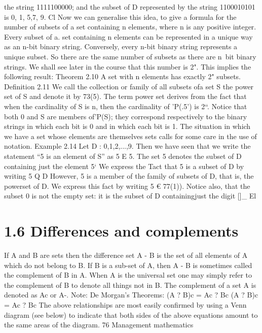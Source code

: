 \documentclass{beamer}
\begin{document}
\begin{frame}
\begin{frame}
the string 1111100000; and the subset of D represented by the string 1100010101 is {0, 1, 5,7, 9}.
Cl
Now we can generalise this idea, to give a formula for the number of subsets of a set containing
n elements, where n is any positive integer. Every subset of a. set containing n elements can
be represented in a unique way as an n-bit binary string. Conversely, every n-bit binary string
represents a unique subset. So there are the same number of subsets as there are n~bit binary
strings. We shall see later in the course that this number is 2". This implies the following result:
Theorem 2.10 A set with n elements has exactly 2" subsets.
Deﬁnition 2.11 We call the collection or family of all subsets ofa set S the power set of S and
denote it by 73(5).
The term power set derives from the fact that when the cardinality of S is n, then the cardinality
of ’P(.5') is 2“. Notice that both 0 and S are members of'P(S); they correspond respectively to the
binary strings in which each bit is 0 and in which each bit is 1.
The situation in which we have a set whose elements are themselves sets calls for some care in the
use of notation.
Example 2.14 Let D : {0,1,2,...,9}. Then we have seen that we write the statement “5 is an
element of S” as
5 E 5.
The set {5} denotes the subset of D containing just the element 5‘ We express the Tact that {5}
is a subset of D by writing
{5} Q D
However, {5} is a member of the family of subsets of D, that is, the powerset of D. We express
this fact by writing
{5} € 77(1)).
Notice also, that the subset {0} is not the empty set: it is the subset of D containingjust the digit
[]_ El


\section{1.6 Differences and complements}
If A and B are sets then the difference set A - B is the set of all elements
of A which do not belong to B.
If B is a sub-set of A, then A - B is sometimes called the complement of
B in A. When A is the universal set one may simply refer to the
complement of B to denote all things not in B. The complement of a set A
is denoted as Ac or A-.
Note: De Morgan’s Theorems:
(A ? B)c = Ac ? Bc
(A ? B)c = Ac ? Bc
The above relationships are most easily confirmed by using a Venn
diagram (see below) to indicate that both sides of the above equations
amount to the same areas of the diagram.
76 Management mathematics


\end{frame}
\end{frame}
\end{document}
